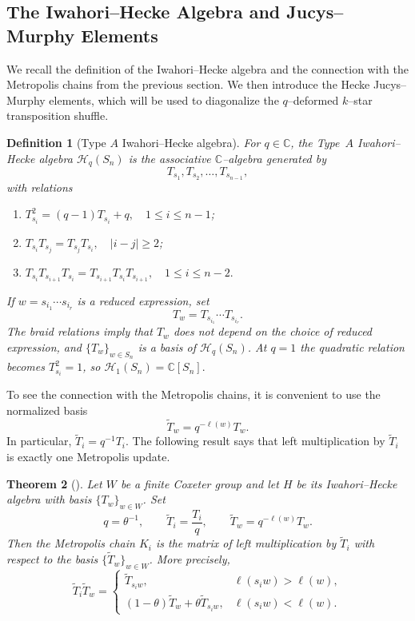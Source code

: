 \documentclass[11pt]{article}
\theoremstyle{plain}  %
\newtheorem{theorem}{Theorem}[section]
\newtheorem{definition}[theorem]{Definition}
\begin{document}

\subsection{The Iwahori--Hecke Algebra and Jucys--Murphy Elements}
\label{sec:heckejm}

We recall the definition of the Iwahori--Hecke algebra and the connection with the
Metropolis chains from the previous section. We then introduce the Hecke
Jucys--Murphy elements, which will be used to diagonalize the $q$--deformed
$k$--star transposition shuffle.

\begin{definition}[Type $A$ Iwahori--Hecke algebra]\label{def:hecke}
For $q\in\mathbb C$, the \emph{Type~$A$ Iwahori--Hecke algebra}
$\mathcal H_q(S_n)$ is the associative $\mathbb C$--algebra generated by
\[
T_{s_1},T_{s_2},\ldots,T_{s_{n-1}},
\]
with relations
\begin{enumerate}
\item $T_{s_i}^2=(q-1)T_{s_i}+q, \quad 1\le i\le n-1$;
\item $T_{s_i}T_{s_j}=T_{s_j}T_{s_i}, \quad|i-j|\ge2$;
\item
$
T_{s_i}T_{s_{i+1}}T_{s_i}
=
T_{s_{i+1}}T_{s_i}T_{s_{i+1}},
\quad 1\le i\le n-2.
$
\end{enumerate}
If $w=s_{i_1}\cdots s_{i_r}$ is a reduced expression, set
\[
T_w=T_{s_{i_1}}\cdots T_{s_{i_r}}.
\]
The braid relations imply that $T_w$ does not depend on the choice of reduced
expression, and $\{T_w\}_{w\in S_n}$ is a basis of $\mathcal H_q(S_n)$.
At $q=1$ the quadratic relation becomes $T_{s_i}^2=1$, so
$
\mathcal H_1(S_n)=\mathbb C[S_n].
$
\end{definition}

To see the connection with the Metropolis chains, it is convenient to use the
normalized basis
\[
\widetilde T_w=q^{-\ell(w)}T_w.
\]
In particular, $\widetilde T_i=q^{-1}T_i$. The following result says that left
multiplication by $\widetilde T_i$ is exactly one Metropolis update.

\begin{theorem}[{\cite[Theorem~4.3]{DiaconisRam2000}}]\label{thm:metropolis-hecke}
Let $W$ be a finite Coxeter group and let $H$ be its Iwahori--Hecke algebra with
basis $\{T_w\}_{w\in W}$. Set
\[
q=\theta^{-1},\qquad
\widetilde T_i=\frac{T_i}{q},\qquad
\widetilde T_w=q^{-\ell(w)}T_w.
\]
Then the Metropolis chain $K_i$ is the matrix of left multiplication by
$\widetilde T_i$ with respect to the basis
$\{\widetilde T_w\}_{w\in W}$. More precisely,
\[
\widetilde T_i\widetilde T_w=
\begin{cases}
\widetilde T_{s_iw},
& \ell(s_iw)>\ell(w),\\[1mm]
(1-\theta)\widetilde T_w+\theta\widetilde T_{s_iw},
& \ell(s_iw)<\ell(w).
\end{cases}
\]
\end{theorem}
\end{document}
